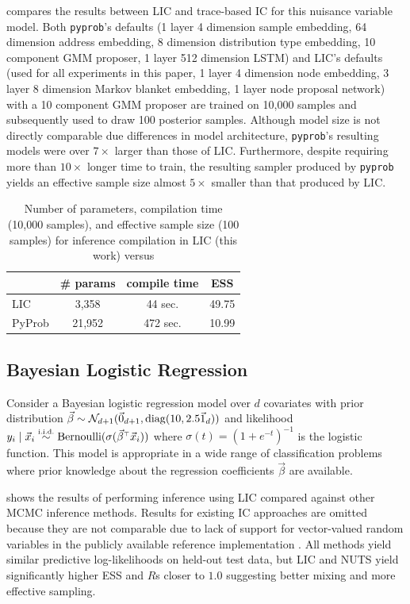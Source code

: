 \documentclass[../../thesis.tex]{subfiles}
\begin{document}
 compares the results between LIC and trace-based IC
\citep{le2017inference} for this nuisance variable model. Both \texttt{pyprob}'s
defaults (1 layer 4 dimension sample embedding, 64 dimension address
embedding, 8 dimension distribution type embedding, 10 component GMM
proposer, 1 layer 512 dimension LSTM) and LIC's defaults (used for all
experiments in this paper, 1 layer 4 dimension node embedding, 3 layer 8
dimension Markov blanket embedding, 1 layer node proposal network) with a 10
component GMM proposer are trained on 10,000 samples and subsequently used to
draw 100 posterior samples. Although model size is not directly comparable due
differences in model architecture, \texttt{pyprob}'s resulting models were over $7\times$
larger than those of LIC. Furthermore, despite requiring more than $10\times$ longer
time to train, the resulting sampler produced by \texttt{pyprob} yields
an effective sample size almost $5\times$ smaller than that produced by LIC.
\begin{table}
  \centering
  \begin{tabular}{lccc}
    \toprule
           & \# params & compile time & ESS   \\
    \midrule
    LIC    & 3,358     & 44 sec.      & 49.75 \\
    PyProb & 21,952    & 472 sec.     & 10.99 \\
    \bottomrule
  \end{tabular}
  \caption{Number of parameters, compilation time (10,000 samples), and effective sample size (100 samples)
    for inference compilation in LIC (this work)
    versus \citep{pyprob2020}
  }\label{fig:nuisance}
\end{table}

\subsection{Bayesian Logistic Regression}
\label{ssec:blr}

Consider a Bayesian logistic regression model over $d$ covariates
with prior distribution
$\vec{\beta} \sim \mathcal{N}_{d+1}(\vec{0}_{d+1}, \operatorname*{\mathop{\mathrm{diag}}}(10, 2.5\vec{1}_{d}))$
and likelihood $y_i \mid \vx_i \simiid \text{Bernoulli}(\sigma(\vec{\beta}^\top \vx_i))$
where $\sigma(t) = (1 + e^{-t})^{-1}$ is the logistic function.
This model is appropriate in a wide range of classification problems where prior
knowledge about the regression coefficients $\vec{\beta}$ are available.

 shows the results of performing inference using LIC compared
against other MCMC inference methods. Results for existing IC approaches
\citep{le2017inference} are omitted because they are not comparable due to
lack of support for vector-valued random variables in the publicly
available reference implementation \citep{pyprob2020}. All methods yield
similar predictive log-likelihoods on held-out test data, but LIC and NUTS
yield significantly higher ESS and $\widehat{R}$s closer to $1.0$ suggesting
better mixing and more effective sampling.
\end{document}
